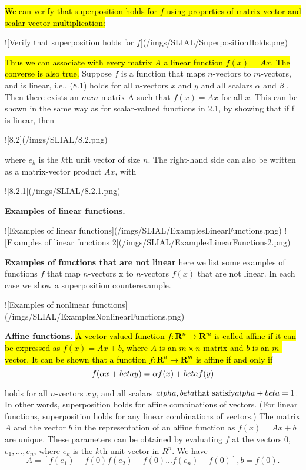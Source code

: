 \documentclass[11pt,oneside,a4paper,openright]{article}
\begin{document}
\hl{We can verify that superposition holds for $f$ using properties of matrix-vector and scalar-vector multiplication:}

![Verify that superposition holds for $f$](/imgs/SLIAL/SuperpositionHolds.png)

\hl{Thus we can associate with every matrix $A$ a linear function $f(x) = Ax$.
The converse is also true.} Suppose $f$ is a function that maps $n$-vectors to $m$-vectors, and is linear, i.e., (8.1) holds for all $n$-vectors $x$ and $y$ and all scalars $\alpha$ and $\beta$ . Then there exists an $m x n$ matrix A such that $f(x) = Ax$ for all $x$. This can be shown in the same way as for scalar-valued functions in 2.1, by showing that if f is linear, then

![8.2](/imgs/SLIAL/8.2.png)

where $e_k$ is the $k$th unit vector of size $n$. The right-hand side can also be written as a matrix-vector product $Ax$, with

![8.2.1](/imgs/SLIAL/8.2.1.png)

\textbf{Examples of linear functions.}

![Examples of linear functions](/imgs/SLIAL/ExamplesLinearFunctions.png)
![Examples of linear functions 2](/imgs/SLIAL/ExamplesLinearFunctions2.png)

\textbf{Examples of functions that are not linear} here we list some examples of functions $f$ that map $n$-vectors x to $n$-vectors $f(x)$ that are not linear. In each case
we show a superposition counterexample.

![Examples of nonlinear functions](/imgs/SLIAL/ExamplesNonlinearFunctions.png)

\textbf{Affine functions.} \hl{A vector-valued function $f : \textbf{R}^n → \textbf{R}^m$ is called affine if it can be expressed as $f(x) = Ax + b$, where $A$ is an $m × n$ matrix and $b$ is an $m$-vector. It can be shown that a function $f : \textbf{R}^n → \textbf{R}^m$ is affine if and only if}
\begin{equation}
f(\alpha x + \\beta y) = \alpha f(x) + \\beta f(y)    
\end{equation}


holds for all $n$-vectors $x\, y$, and all scalars $\\alpha, \\beta \text{that satisfy} \\alpha + \\beta = 1$. In other words, superposition holds for affine combinations of vectors. (For linear functions, superposition holds for any linear combinations of vectors.) 
The matrix $A$ and the vector $b$ in the representation of an affine function as $f(x) = Ax + b$ are unique. These parameters can be obtained by evaluating $f$ at the vectors 0, $e_1, . . . , e_n$, where $e_k$ is the $k$th unit vector in $R^n$. We have
\begin{equation}
A = [f(e_1) - f(0) f(e_2) - f(0) ... f(e_n) - f(0)], b = f(0).    
\end{equation}
\end{document}
